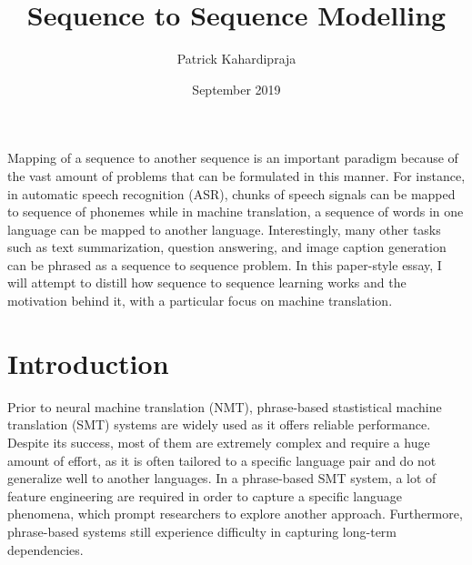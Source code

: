 \documentclass[12pt]{extarticle}
\title{Sequence to Sequence Modelling}
\author{Patrick Kahardipraja}
\date{September 2019}
\begin{document}

\maketitle

Mapping of a sequence to another sequence is an important paradigm because of the vast amount of problems that can be formulated in this manner. For instance, in automatic speech recognition (ASR), chunks of speech signals can be mapped to sequence of phonemes while in machine translation, a sequence of words in one language can be mapped to another language. Interestingly, many other tasks such as text summarization, question answering, and image caption generation can be phrased as a sequence to sequence problem. In this paper-style essay, I will attempt to distill how sequence to sequence learning works and the motivation behind it, with a particular focus on machine translation.


\section*{Introduction}


Prior to neural machine translation (NMT), phrase-based stastistical machine translation (SMT) systems are widely used as it offers reliable performance. Despite its success, most of them are extremely complex and require a huge amount of effort, as it is often tailored to a specific language pair and do not generalize well to another languages. In a phrase-based SMT system, a lot of feature engineering are required in order to capture a specific language phenomena, which prompt researchers to explore another approach. Furthermore, phrase-based systems still experience difficulty in capturing long-term dependencies.
\end{document}
